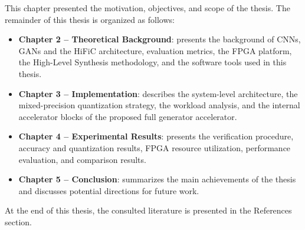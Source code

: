 This chapter presented the motivation, objectives, and scope of the thesis. The remainder of this thesis is organized as follows:
\begin{itemize}
    \item \textbf{Chapter 2 -- Theoretical Background}: presents the background of CNNs, GANs and the HiFiC architecture, evaluation metrics, the FPGA platform, the High-Level Synthesis methodology, and the software tools used in this thesis.
    \item \textbf{Chapter 3 -- Implementation}: describes the system-level architecture, the mixed-precision quantization strategy, the workload analysis, and the internal accelerator blocks of the proposed full generator accelerator.
    \item \textbf{Chapter 4 -- Experimental Results}: presents the verification procedure, accuracy and quantization results, FPGA resource utilization, performance evaluation, and comparison results.
    \item \textbf{Chapter 5 -- Conclusion}: summarizes the main achievements of the thesis and discusses potential directions for future work.
\end{itemize}
At the end of this thesis, the consulted literature is presented in the References section.
